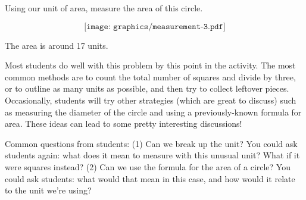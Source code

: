 \documentclass[handout]{ximera}
\begin{document}
\begin{problem}
Using our unit of area, measure the area of this circle.

\[
\texttt{[image: graphics/measurement-3.pdf]}
\]

\begin{solution}
    The area is around 17 units.
\end{solution}

\begin{instructorNotes}
    Most students do well with this problem by this point in the activity.  The most common methods are to count the total number of squares and divide by three, or to outline as many units as possible, and then try to collect leftover pieces.  Occasionally, students will try other strategies (which are great to discuss) such as measuring the diameter of the circle and using a previously-known formula for area.  These ideas can lead to some pretty interesting discussions!
    
    Common questions from students: (1) Can we break up the unit?  You could ask students again: what does it mean to measure with this unusual unit?  What if it were squares instead? (2) Can we use the formula for the area of a circle?  You could ask students: what would that mean in this case, and how would it relate to the unit we're using?
\end{instructorNotes}

\end{problem}
\end{document}
